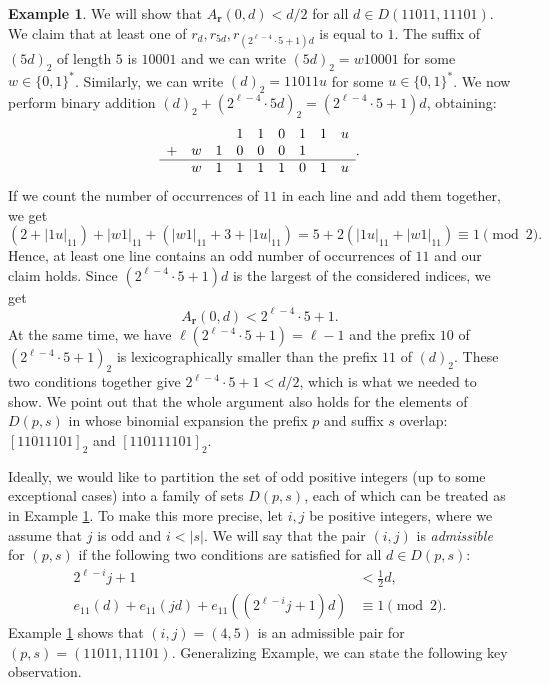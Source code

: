 \documentclass[a4paper,11pt]{amsart}
\theoremstyle{definition}
\newtheorem{ex}{Example}
\begin{document}
\begin{ex} \label{ex:basic_concept}
We will show that $A_{\mathbf{r}}(0,d) < d/2$ for all $d \in D(11011,11101)$. We claim that at least one of $r_{d}, r_{5d}, r_{(2^{\ell-4} \cdot 5+1)d}$ is equal to $1$. The suffix of $(5d)_2$ of length $5$ is $10001$ and we can write $(5d)_2 = w10001$ for some $w \in \{0,1\}^*$. Similarly, we can write $(d)_2=11011u$ for some $u \in \{0,1\}^*$. We now perform binary addition $(d)_2+ (2^{\ell-4} \cdot 5d)_2= (2^{\ell-4} \cdot 5+1)d$, obtaining:
$$\begin{array}{lllllllllll}
       &   &   & 1 & 1 & 0 & 1 & 1 & u \\
+      & w & 1 & 0 & 0 & 0 & 1 &   &   \\
\hline & w & 1 & 1 & 1 & 1 & 0 & 1 & u
\end{array}.$$
If we count the number of occurrences of $11$ in each line and add them together, we get
$$ (2 + |1u|_{11}) + |w1|_{11} + (|w1|_{11} + 3 + |1u|_{11}) = 5 + 2(|1u|_{11} + |w1|_{11}) \equiv 1  \pmod{2}. $$
Hence, at least one line contains an odd number of occurrences of $11$ and our claim holds. Since $(2^{\ell-4} \cdot 5+1)d$ is the largest of the considered indices, we get
$$ A_{\mathbf{r}}(0,d) < 2^{\ell-4} \cdot 5+1.$$
At the same time, we have $\ell(2^{\ell-4} \cdot 5+1) = \ell-1$ and the prefix $10$ of $(2^{\ell-4} \cdot 5+1)_2$ is lexicographically smaller than the prefix $11$ of $(d)_2$. These two conditions together give $2^{\ell-4} \cdot 5+1 < d/2$, which is what we needed to show. 
We point out that the whole argument also holds for the elements of $D(p,s)$ in whose binomial expansion the prefix $p$ and suffix $s$ overlap: $[11011101]_2$ and $[110111101]_2$. 
\end{ex}

Ideally, we would like to partition the set of odd positive integers (up to some exceptional cases) into a family of sets $D(p,s)$, each of which can be treated as in Example \ref{ex:basic_concept}. To make this more precise, let $i,j$ be positive integers, where we assume that $j$ is odd and $i<|s|$. We will say that the pair $(i,j)$ is \emph{admissible} for $(p,s)$ if the following two conditions are satisfied for all $d \in D(p,s)$:
\begin{align}
  2^{\ell-i} j+1 &< \frac{1}{2} d,  \tag{A1} \label{eq:A1} \\
  e_{11}(d) + e_{11}(jd) + e_{11}((2^{\ell-i} j+1)d) &\equiv 1 \pmod{2}. \tag{A2} \label{eq:A2}
\end{align}
Example \ref{ex:basic_concept} shows that $(i,j) = (4,5)$ is an admissible pair for $(p,s)=(11011,11101)$. Generalizing Example, we can state the following key observation.
\end{document}
